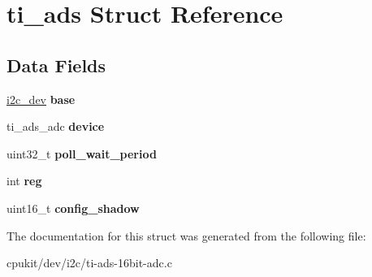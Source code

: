 \hypertarget{structti__ads}{}\section{ti\+\_\+ads Struct Reference}
\label{structti__ads}
\subsection*{Data Fields}
\begin{DoxyCompactItemize}
\item 
\mbox{\label{structti__ads_a1f05215e3175efebcf88e47d36eaaca6}} 
\mbox{\hyperlink{structi2c__dev}{i2c\+\_\+dev}} {\bfseries base}
\item 
\mbox{\label{structti__ads_a0ac01286db20975cf3228559b58120ec}} 
ti\+\_\+ads\+\_\+adc {\bfseries device}
\item 
\mbox{\label{structti__ads_ab7fe8969e459d82924c3cdf06952d018}} 
uint32\+\_\+t {\bfseries poll\+\_\+wait\+\_\+period}
\item 
\mbox{\label{structti__ads_ab8f2aa6b43ff9a72cc9465c19c1496e1}} 
int {\bfseries reg}
\item 
\mbox{\label{structti__ads_abb7eac71b7e03cab2301d8a7887fa3f1}} 
uint16\+\_\+t {\bfseries config\+\_\+shadow}
\end{DoxyCompactItemize}


The documentation for this struct was generated from the following file\+:\begin{DoxyCompactItemize}
\item 
cpukit/dev/i2c/ti-\/ads-\/16bit-\/adc.\+c\end{DoxyCompactItemize}
